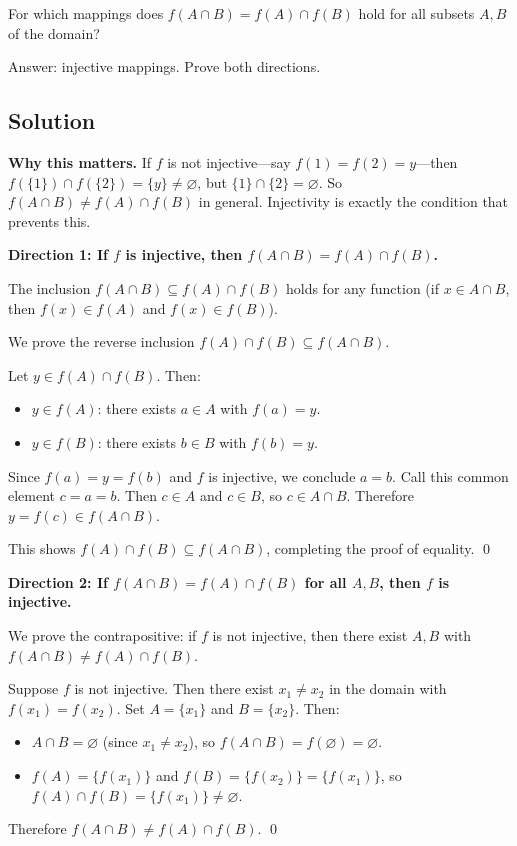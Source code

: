 \documentclass[12pt, a4paper]{article}
\begin{document}
\begin{problembox}
For which mappings does $f(A \cap B) = f(A) \cap f(B)$ hold for all subsets $A, B$ of the domain?

Answer: injective mappings. Prove both directions.
\end{problembox}

\subsection*{Solution}

\textbf{Why this matters.}\; If $f$ is not injective---say $f(1) = f(2) = y$---then $f(\{1\}) \cap f(\{2\}) = \{y\} \neq \varnothing$, but $\{1\} \cap \{2\} = \varnothing$. So $f(A \cap B) \neq f(A) \cap f(B)$ in general. Injectivity is exactly the condition that prevents this.

\medskip

\textbf{Direction 1: If $f$ is injective, then $f(A \cap B) = f(A) \cap f(B)$.}

The inclusion $f(A \cap B) \subseteq f(A) \cap f(B)$ holds for any function (if $x \in A \cap B$, then $f(x) \in f(A)$ and $f(x) \in f(B)$).

We prove the reverse inclusion $f(A) \cap f(B) \subseteq f(A \cap B)$.

Let $y \in f(A) \cap f(B)$. Then:
\begin{itemize}[nosep]
  \item $y \in f(A)$: there exists $a \in A$ with $f(a) = y$.
  \item $y \in f(B)$: there exists $b \in B$ with $f(b) = y$.
\end{itemize}
Since $f(a) = y = f(b)$ and $f$ is injective, we conclude $a = b$.
Call this common element $c = a = b$. Then $c \in A$ and $c \in B$, so $c \in A \cap B$.
Therefore $y = f(c) \in f(A \cap B)$.

This shows $f(A) \cap f(B) \subseteq f(A \cap B)$, completing the proof of equality. \qed

\bigskip
\textbf{Direction 2: If $f(A \cap B) = f(A) \cap f(B)$ for all $A, B$, then $f$ is injective.}

We prove the contrapositive: if $f$ is not injective, then there exist $A, B$ with $f(A \cap B) \neq f(A) \cap f(B)$.

Suppose $f$ is not injective. Then there exist $x_1 \neq x_2$ in the domain with $f(x_1) = f(x_2)$.
Set $A = \{x_1\}$ and $B = \{x_2\}$. Then:
\begin{itemize}[nosep]
  \item $A \cap B = \varnothing$ (since $x_1 \neq x_2$), so $f(A \cap B) = f(\varnothing) = \varnothing$.
  \item $f(A) = \{f(x_1)\}$ and $f(B) = \{f(x_2)\} = \{f(x_1)\}$,
        so $f(A) \cap f(B) = \{f(x_1)\} \neq \varnothing$.
\end{itemize}
Therefore $f(A \cap B) \neq f(A) \cap f(B)$. \qed
\end{document}
